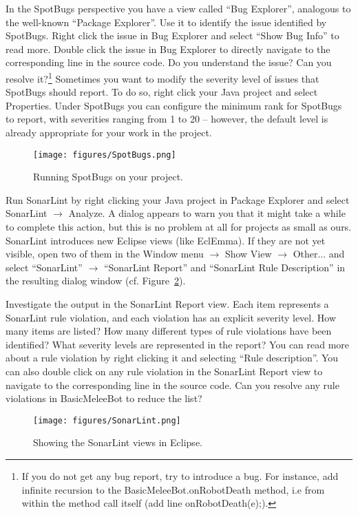 \documentclass{scrreprt}
\begin{document}
In the SpotBugs perspective you have a view called ``Bug Explorer'', analogous to the well-known ``Package Explorer''. Use it to identify the issue identified by SpotBugs. Right click the issue in Bug Explorer and select ``Show Bug Info'' to read more. Double click the issue in Bug Explorer to directly navigate to the corresponding line in the source code. Do you understand the issue? Can you resolve it?\footnote{If you do not get any bug report, try to introduce a bug. For instance, add infinite recursion to the BasicMeleeBot.onRobotDeath method, i.e from within the method call itself (add line onRobotDeath(e);).} Sometimes you want to modify the severity level of issues that SpotBugs should report. To do so, right click your Java project and select Properties. Under SpotBugs you can configure the minimum rank for SpotBugs to report, with severities ranging from 1 to 20 -- however, the default level is already appropriate for your work in the project.

\begin{figure}
\centering
\texttt{[image: figures/SpotBugs.png]}
\caption{Running SpotBugs on your project.}
\label{fig:spotbugs}
\end{figure}

Run SonarLint by right clicking your Java project in Package Explorer and select SonarLint $\rightarrow$ Analyze. A dialog appears to warn you that it might take a while to complete this action, but this is no problem at all for projects as small as ours. SonarLint introduces new Eclipse views (like EclEmma). If they are not yet visible, open two of them in the Window menu $\rightarrow$ Show View $\rightarrow$ Other... and select ``SonarLint'' $\rightarrow$ ``SonarLint Report'' and ``SonarLint Rule Description'' in the resulting dialog window (cf. Figure~\ref{fig:sonarlint}). 

Investigate the output in the SonarLint Report view. Each item represents a SonarLint rule violation, and each violation has an explicit severity level. How many items are listed? How many different types of rule violations have been identified? What severity levels are represented in the report? You can read more about a rule violation by right clicking it and selecting ``Rule description''. You can also double click on any rule violation in the SonarLint Report view to navigate to the corresponding line in the source code. Can you resolve any rule violations in BasicMeleeBot to reduce the list?

\begin{figure}
\centering
\texttt{[image: figures/SonarLint.png]}
\caption{Showing the SonarLint views in Eclipse.}
\label{fig:sonarlint}
\end{figure}
\end{document}
